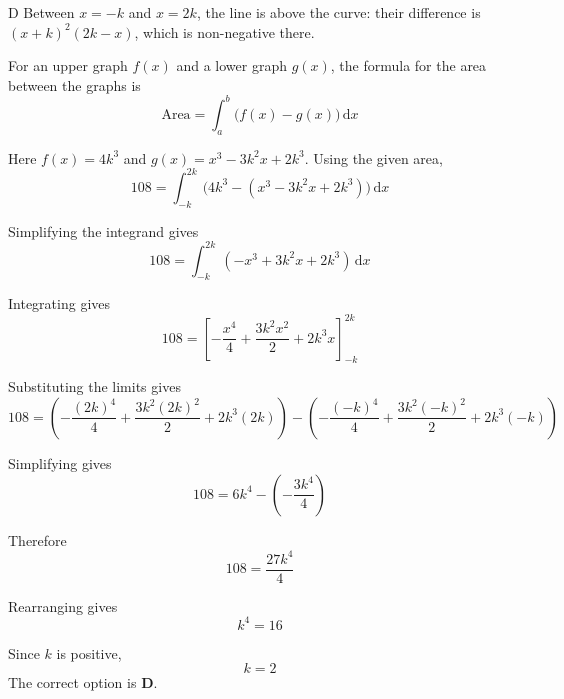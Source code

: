 \documentclass[11pt,a4paper]{article}
\begin{document}
\begin{enumerate}[label=\textbf{\arabic*.},leftmargin=*,itemsep=0pt,start=17]
\begin{djsSolution}{D}
Between $x=-k$ and $x=2k$, the line is above the curve: their difference is $(x+k)^2(2k-x)$, which is non-negative there. 

For an upper graph $f(x)$ and a lower graph $g(x)$, the formula for the area between the graphs is
\[
\text{Area}=\int_a^b\bigl(f(x)-g(x)\bigr)\,\mathrm{d}x
\]

Here $f(x)=4k^3$ and $g(x)=x^3-3k^2x+2k^3$. Using the given area,
\[
108=\int_{-k}^{2k}\bigl(4k^3-(x^3-3k^2x+2k^3)\bigr)\,\mathrm{d}x
\]

Simplifying the integrand gives
\[
108=\int_{-k}^{2k}(-x^3+3k^2x+2k^3)\,\mathrm{d}x
\]

Integrating gives
\[
108=\left[-\frac{x^4}{4}+\frac{3k^2x^2}{2}+2k^3x\right]_{-k}^{2k}
\]

Substituting the limits gives
\[
108=\left(-\frac{(2k)^4}{4}+\frac{3k^2(2k)^2}{2}+2k^3(2k)\right)-\left(-\frac{(-k)^4}{4}+\frac{3k^2(-k)^2}{2}+2k^3(-k)\right)
\]

Simplifying gives
\[
108=6k^4-\left(-\frac{3k^4}{4}\right)
\]

Therefore
\[
108=\frac{27k^4}{4}
\]

Rearranging gives
\[
k^4=16
\]

Since $k$ is positive,
\[
k=2
\]
The correct option is \textbf{D}.
\end{djsSolution}
\end{enumerate}
\clearpage
\thispagestyle{djssolutions}
\vspace*{8pt}
\end{document}
